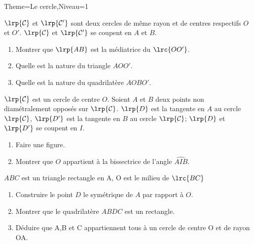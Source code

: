 \documentclass[a4paper,12pt]{article}
\begin{document}
\begin{Maquette}[Fiche]{Theme=Le cercle,Niveau=1}
\begin{exercice}
\begin{minipage}{0.5\linewidth}
$\lrp{\mathcal{C}}$ et $\lrp{\mathcal{C'}}$ sont deux cercles de même rayon et de centres respectifs $O$ et $O'$. $\lrp{\mathcal{C}}$ et $\lrp{\mathcal{C'}}$ se coupent en $A$ et $B$.
\begin{enumerate}
\item Montrer que $\lrp{AB}$ est la médiatrice du $\lrc{OO'}$.
\item Quelle est la nature du triangle $AOO'$.
\item Quelle est la nature du quadrilatère $AOBO'$.
\end{enumerate}
\end{minipage}%
\begin{minipage}{0.5\linewidth}
\end{minipage}
\end{exercice}

\begin{exercice}
$\lrp{\mathcal{C}}$ est un cercle de centre $O$. Soient $A$ et $B$ deux points non diamétralement opposés sur $\lrp{\mathcal{C}}$. $\lrp{D}$ est la tangente en $A$ au cercle $\lrp{\mathcal{C}}$, $\lrp{D'}$ est la tangente en $B$ au cercle $\lrp{\mathcal{C}}$; $\lrp{D}$ et $\lrp{D'}$ se coupent en $I$.
\begin{enumerate}
\item Faire une  figure.
\item Montrer que $O$ appartient à la bissectrice de l'angle $\widehat{AIB}$.
\end{enumerate}
\end{exercice}

\begin{exercice}
$ABC$ est un triangle rectangle en A, O est le milieu de $\lrc{BC}$
\begin{enumerate}
\item Construire le point $D$ le symétrique de $A$ par rapport à $O$.
\item Montrer que le quadrilatère $ABDC$ est un rectangle.
\item Déduire que A,B et C appartiennent tous à un cercle de centre O et de rayon OA.
\end{enumerate}
\end{exercice}


\end{Maquette}
\end{document}
